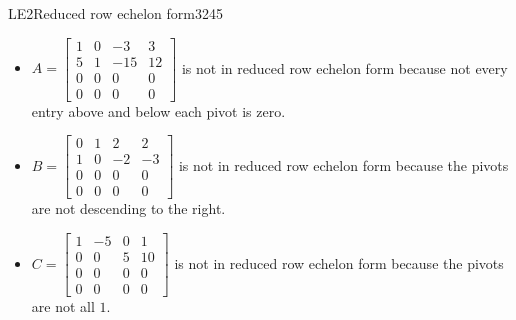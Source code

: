 \begin{exercise}{LE2}{Reduced row echelon form}{3245}
\begin{exerciseStatement}
     \end{exerciseStatement}
 \begin{exerciseAnswer} 

\begin{itemize}
\item  

 \(A=\left[\begin{array}{cccc}
1 & 0 & -3 & 3 \\
5 & 1 & -15 & 12 \\
0 & 0 & 0 & 0 \\
0 & 0 & 0 & 0
\end{array}\right]\) is not in reduced row echelon form because not every entry above and below each pivot is zero. 

 
\item  

 \(B=\left[\begin{array}{cccc}
0 & 1 & 2 & 2 \\
1 & 0 & -2 & -3 \\
0 & 0 & 0 & 0 \\
0 & 0 & 0 & 0
\end{array}\right]\) is not in reduced row echelon form because the pivots are not descending to the right. 

 
\item  

 \(C=\left[\begin{array}{cccc}
1 & -5 & 0 & 1 \\
0 & 0 & 5 & 10 \\
0 & 0 & 0 & 0 \\
0 & 0 & 0 & 0
\end{array}\right]\) is not in reduced row echelon form because the pivots are not all \(1\). 

 
\end{itemize}

     \end{exerciseAnswer}
 \end{exercise}



